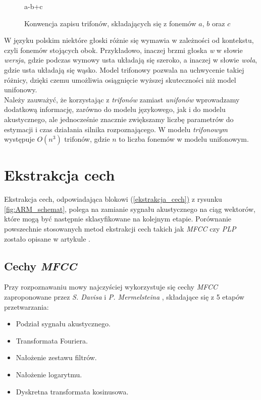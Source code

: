 \documentclass[shortabstract, mgr]{iithesis}
\newcommand{\refBlock}[1]{(\hyperref[#1]{\ref*{#1})}
}
\begin{document}
		\begin{figure}[H]
			\begin{center}
			{a-b+c}
			\end{center}
			\caption{Konwencja zapisu trifonów, składających się z fonemów $a$, $b$ oraz $c$}
			\label{fig:tri-fony_notacja}
		\end{figure}
	
		W języku polskim niektóre głoski różnie się wymawia w zależności od kontekstu, czyli fonemów stojących obok. Przykładowo, inaczej brzmi głoska \textit{w} w słowie \textit{wersja}, gdzie podczas wymowy usta układają się szeroko, a inaczej w słowie \textit{wola}, gdzie usta układają się wąsko. Model trifonowy pozwala na uchwycenie takiej różnicy, dzięki czemu umożliwia osiągnięcie wyższej skuteczności niż model unifonowy.
		\\
		Należy zauważyć, że korzystając z \textit{trifonów} zamiast \textit{unifonów} wprowadzamy dodatkową informację, zarówno do modelu językowego, jak i do modelu akustycznego, ale jednocześnie znacznie zwiększamy liczbę parametrów do estymacji i czas działania silnika rozpoznającego. W modelu \textit{trifonowym} występuje $O(n^3)$ trifonów, gdzie $n$ to liczba fonemów w modelu unifonowym.  
		
	\section{ Ekstrakcja cech }

	 Ekstrakcja cech, odpowiadająca blokowi \refBlock{ekstrakcja_cech} z rysunku \ref{fig:ARM_schemat}, polega na zamianie sygnału akustycznego na ciąg wektorów, które mogą być następnie sklasyfikowane na kolejnym etapie. Porównanie powszechnie stosowanych metod ekstrakcji cech takich jak \textit{MFCC} czy \textit{PLP} zostało opisane w artykule \cite{feature_comparision}.
	 \subsection{Cechy \textit{MFCC}}
	 \label{sec:Feature_vec_mfcc}
	 Przy rozpoznawaniu mowy najczyściej wykorzystuje się cechy \textit{MFCC} zaproponowane przez \textit{S. Davisa} i \textit{P. Mermelsteina} \cite{mfcc}, składające się z 5 etapów przetwarzania:
	 
	 \begin{itemize}
	 	\item Podział sygnału akustycznego.
	 	\item Transformata Fouriera.
	 	\item Nałożenie zestawu filtrów.
	 	\item Nałożenie logarytmu. 
	 	\item Dyskretna transformata kosinusowa.
	 \end{itemize}
 
\end{document}
